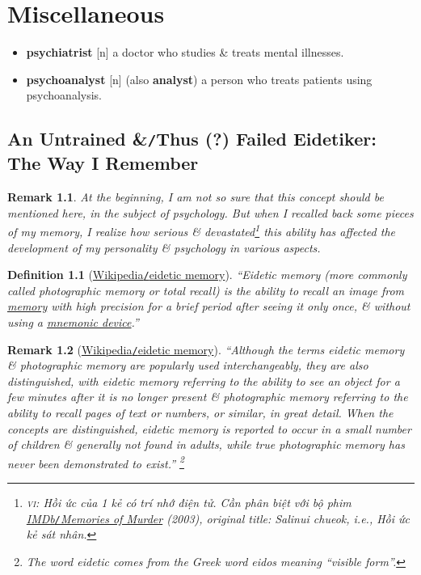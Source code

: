 \documentclass[oneside]{book}
\numberwithin{equation}{section}
\newtheorem{definition}{Definition}[chapter]
\newtheorem{remark}{Remark}[chapter]
\begin{document}

\chapter{Miscellaneous}

\begin{itemize}
	\item \textbf{psychiatrist} [n] a doctor who studies \& treats mental illnesses.
	\item \textbf{psychoanalyst} [n] (also \textbf{analyst}) a person who treats patients using psychoanalysis.
\end{itemize}

\section{An Untrained \&\texttt{/}Thus (?) Failed Eidetiker: The Way I Remember}

\begin{remark}
	At the beginning, I am not so sure that this concept should be mentioned here, in the subject of psychology. But when I recalled back some pieces of my memory, I realize how serious \& devastated\footnote{\textsc{vi}: Hồi ức của 1 kẻ có trí nhớ điện tử. Cần phân biệt với bộ phim \href{https://www.imdb.com/title/tt0353969/}{IMDb\texttt{/}Memories of Murder} (2003), original title: Salinui chueok, i.e., Hồi ức kẻ sát nhân.} this ability has affected the development of my personality \& psychology in various aspects.
\end{remark}

\begin{definition}[\href{https://en.wikipedia.org/wiki/Eidetic_memory}{Wikipedia\texttt{/}eidetic memory}]
	``\emph{Eidetic memory} (more commonly called \emph{photographic memory} or \emph{total recall}) is the ability to recall an image from \href{https://en.wikipedia.org/wiki/Memory}{memory} with high precision for a brief period after seeing it only once, \& without using a \href{https://en.wikipedia.org/wiki/Mnemonic_device}{mnemonic device}.''
\end{definition}

\begin{remark}[\href{https://en.wikipedia.org/wiki/Eidetic_memory}{Wikipedia\texttt{/}eidetic memory}]
	``Although the terms \emph{eidetic memory} \& \emph{photographic memory} are popularly used interchangeably, they are also distinguished, with \emph{eidetic memory} referring to the ability to see an object for a few minutes after it is no longer present \& \emph{photographic memory} referring to the ability to recall pages of text or numbers, or similar, in great detail. When the concepts are distinguished, eidetic memory is reported to occur in a small number of children \& generally not found in adults, while true photographic memory has never been demonstrated to exist.'' \footnote{The word eidetic comes from the Greek word \textit{eidos} meaning ``visible form''.}
\end{remark}
\end{document}
